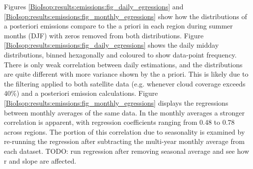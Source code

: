     Figures \ref{BioIsop:results:emissions:fig_daily_egressions} and \ref{BioIsop:results:emissions:fig_monthly_egressions} show how the distributions of a posteriori emissions compare to the a priori in each region during summer months (DJF) with zeros removed from both distributions. %
    Figure \ref{BioIsop:results:emissions:fig_daily_egressions} shows the daily midday distributions, binned hexagonally and coloured to show data-point frequency.
    There is only weak correlation between daily estimations, and the distributions are quite different with more variance shown by the a priori.
    This is likely due to the filtering applied to both satellite data (e.g. whenever cloud coverage exceeds 40\%) and a posteriori emission calculations.
    Figure \ref{BioIsop:results:emissions:fig_monthly_egressions} displays the regressions between monthly averages of the same data. 
    In the monthly averages a stronger correlation is apparent, with regression coefficients ranging from 0.48 to 0.78 across regions.
    The portion of this correlation due to seasonality is examined by re-running the regression after subtracting the multi-year monthly average from each dataset.
    TODO: run regression after removing seasonal average and see how r and slope are affected.
    
    
    
